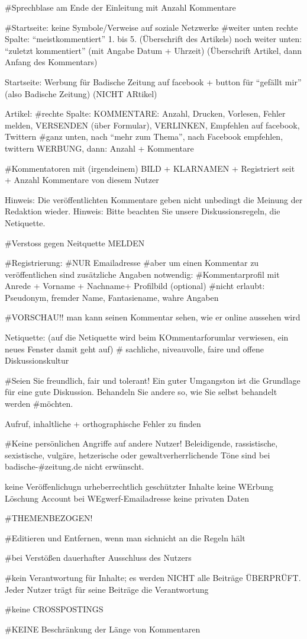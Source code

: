 #Sprechblase am Ende der Einleitung mit Anzahl Kommentare

#Startseite: keine Symbole/Verweise auf soziale Netzwerke
#weiter unten rechte Spalte: ``meistkommentiert'' 1. bis 5. (Überschrift des Artikels)
noch weiter unten: ``zuletzt kommentiert'' (mit Angabe Datum + Uhrzeit) (Überschrift Artikel, dann Anfang des Kommentars)

Startseite:
Werbung für Badische Zeitung auf facebook + button für ``gefällt mir'' (also Badische Zeitung) (NICHT ARtikel)

Artikel: 
#rechte Spalte: KOMMENTARE: Anzahl, Drucken, Vorlesen, Fehler melden, VERSENDEN (über Formular), VERLINKEN, Empfehlen auf facebook, Twittern
#ganz unten, nach ``mehr zum Thema'', nach Facebook empfehlen, twittern WERBUNG, dann: Anzahl + Kommentare

#Kommentatoren mit (irgendeinem) BILD + KLARNAMEN + Registriert seit + Anzahl Kommentare von diesem Nutzer

Hinweis: Die veröffentlichten Kommentare geben nicht unbedingt die Meinung der Redaktion wieder.
Hinweis: Bitte beachten Sie unsere Diskussionsregeln, die Netiquette.



#Verstoss gegen Neitquette MELDEN

#Registrierung:
#NUR Emailadresse
#aber um einen Kommentar zu veröffentlichen sind zusätzliche Angaben notwendig: 
 #Kommentarprofil mit Anrede + Vorname + Nachname+ Profilbild (optional) 
 #nicht erlaubt: Pseudonym, fremder Name, Fantasiename, wahre Angaben
 
 
 #VORSCHAU!! man kann seinen Kommentar sehen, wie er online aussehen wird
 
 
 Netiquette: (auf die Netiquette wird beim KOmmentarforumlar verwiesen, ein neues Fenster damit geht auf)
# sachliche, niveauvolle, faire und offene Diskussionskultur
 
#Seien Sie freundlich, fair und tolerant! Ein guter Umgangston ist die Grundlage für eine gute Diskussion. Behandeln Sie andere so, wie Sie selbst behandelt werden #möchten.

Aufruf, inhaltliche + orthographische Fehler zu finden

#Keine persönlichen Angriffe auf andere Nutzer! Beleidigende, rassistische, sexistische, vulgäre, hetzerische oder gewaltverherrlichende Töne sind bei badische-#zeitung.de nicht erwünscht.

keine Veröffenlichugn urheberrechtlich geschützter Inhalte
keine WErbung 
Löschung Account bei WEgwerf-Emailadresse
keine privaten Daten

#THEMENBEZOGEN!

#Editieren und Entfernen, wenn man sichnicht an die Regeln hält

#bei Verstößen dauerhafter Ausschluss des Nutzers

#kein Verantwortung für Inhalte; es werden NICHT alle Beiträge ÜBERPRÜFT. Jeder Nutzer trägt für seine Beiträge die Verantwortung

#keine CROSSPOSTINGS


#KEINE Beschränkung der Länge von Kommentaren